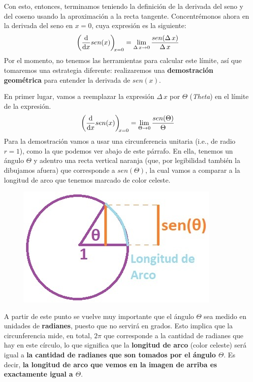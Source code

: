 \documentclass[12pt]{article}
\begin{document}
Con esto, entonces, terminamos teniendo la definición de la derivada del seno y del coseno usando la aproximación a la recta tangente. Concentrémonos ahora en la derivada del seno en $x = 0$, cuya expresión es la siguiente:
\[\diff*{sen(x)}x[x = 0] = \lim_{\Delta \, x \to 0} \frac{sen(\Delta \, x)}{\Delta \, x}\]
Por el momento, no tenemos las herramientas para calcular este límite, así que tomaremos una estrategia diferente: realizaremos una \textbf{demostración geométrica} para entender la derivada de $sen(x)$.

En primer lugar, vamos a reemplazar la expresión $\Delta \, x$ por $\Theta$ (\textit{Theta}) en el límite de la expresión.
\[\diff*{sen(x)}x[x = 0] = \lim_{\Theta \to 0} \frac{sen(\Theta)}{\Theta}\]
Para la demostración vamos a usar una circunferencia unitaria (i.e., de radio $r = 1$), como la que podemos ver abajo de este párrafo. En ella, tenemos un ángulo $\Theta$ y adentro una recta vertical naranja (que, por legibilidad también la dibujamos afuera) que corresponde a $sen(\Theta)$, la cual vamos a comparar a la longitud de arco que tenemos marcado de color celeste.

\newpage

\begin{figure}[hbt!]
\centering
\includegraphics[scale=0.75]{img/geom_proof_sin.jpg}
\end{figure}

A partir de este punto se vuelve muy importante que el ángulo $\Theta$ sea medido en unidades de \textbf{radianes}, puesto que no servirá en grados. Esto implica que la circunferencia mide, en total, $2\pi$ que corresponde a la cantidad de radianes que hay en este círculo, lo que significa que la \textbf{longitud de arco} (color celeste) será igual a \textbf{la cantidad de radianes que son tomados por el ángulo $\Theta$}. Es decir, \textbf{la longitud de arco que vemos en la imagen de arriba es exactamente igual a $\Theta$}.
\end{document}

